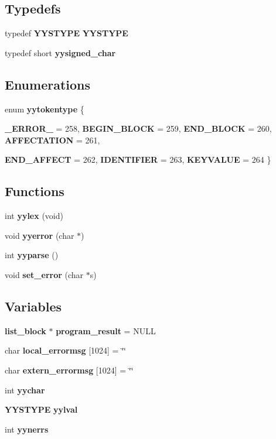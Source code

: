 \subsection*{Typedefs}
\begin{CompactItemize}
\item 
typedef {\bf YYSTYPE} {\bf YYSTYPE}
\item 
typedef short {\bf yysigned\_\-char}
\end{CompactItemize}
\subsection*{Enumerations}
\begin{CompactItemize}
\item 
enum {\bf yytokentype} \{ \par
{\bf \_\-ERROR\_\-} =  258, 
{\bf BEGIN\_\-BLOCK} =  259, 
{\bf END\_\-BLOCK} =  260, 
{\bf AFFECTATION} =  261, 
\par
{\bf END\_\-AFFECT} =  262, 
{\bf IDENTIFIER} =  263, 
{\bf KEYVALUE} =  264
 \}
\end{CompactItemize}
\subsection*{Functions}
\begin{CompactItemize}
\item 
int {\bf yylex} (void)
\item 
void {\bf yyerror} (char $\ast$)
\item 
int {\bf yyparse} ()
\item 
void {\bf set\_\-error} (char $\ast$s)
\end{CompactItemize}
\subsection*{Variables}
\begin{CompactItemize}
\item 
{\bf list\_\-block} $\ast$ {\bf program\_\-result} = NULL
\item 
char {\bf local\_\-errormsg} [1024] = \char`\"{}\char`\"{}
\item 
char {\bf extern\_\-errormsg} [1024] = \char`\"{}\char`\"{}
\item 
int {\bf yychar}
\item 
{\bf YYSTYPE} {\bf yylval}
\item 
int {\bf yynerrs}
\end{CompactItemize}


